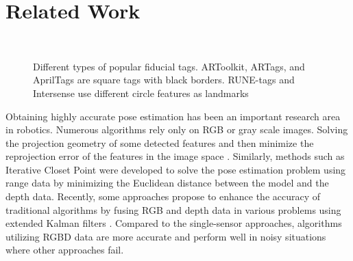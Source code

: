 \section{Related Work}
\label{sec:related}
\begin{figure}
\centering
{} \quad
{} \quad 
{} \\
 \quad
{}
\caption{Different types of popular fiducial tags. ARToolkit, ARTags, and AprilTags are square tags with black borders. RUNE-tags and Intersense use different circle features as landmarks}
\label{fig:tags}
\end{figure}
	Obtaining highly accurate pose estimation has been an important research area in robotics. Numerous algorithms rely only on RGB or gray scale images. Solving the projection geometry of some detected features and then minimize the reprojection error of the features in the image space \citep{grest2009comparison}.  Similarly, methods such as Iterative Closet Point \citep{besl1992method} were developed to solve the pose estimation problem using range data by minimizing the Euclidean distance between the model and the depth data. Recently, some approaches propose to enhance the accuracy of traditional algorithms by fusing RGB and depth data in various problems using extended Kalman filters \citep{gedik2015rgbd, assa2014robust}. Compared to the single-sensor approaches, algorithms utilizing RGBD data are more accurate and perform well in noisy situations where other approaches fail. 
	

